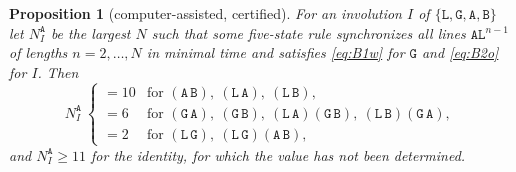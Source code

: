 \documentclass[11pt]{article}
\newtheorem{proposition}[lemma]{Proposition}
\theoremstyle{remark}
\newcommand{\Lq}{\mathtt{L}}\newcommand{\Gq}{\mathtt{G}}\newcommand{\Aq}{\mathtt{A}}\newcommand{\Bq}{\mathtt{B}}\newcommand{\Fq}{\mathtt{F}}
\begin{document}
\begin{proposition}[computer-assisted, certified]\label{prop:otherstate}
For an involution $I$ of $\{\Lq,\Gq,\Aq,\Bq\}$ let $N^{\Aq}_I$ be the largest $N$ such that some five-state
rule synchronizes all lines $\Aq\Lq^{n-1}$ of lengths $n=2,\dots,N$ in minimal time and satisfies
\eqref{eq:B1w} for $\Gq$ and \eqref{eq:B2o} for $I$. Then
\[
N^{\Aq}_I\ \begin{cases}
=10&\text{for }(\Aq\,\Bq),\ (\Lq\,\Aq),\ (\Lq\,\Bq),\\
=6&\text{for }(\Gq\,\Aq),\ (\Gq\,\Bq),\ (\Lq\,\Aq)(\Gq\,\Bq),\ (\Lq\,\Bq)(\Gq\,\Aq),\\
=2&\text{for }(\Lq\,\Gq),\ (\Lq\,\Gq)(\Aq\,\Bq),
\end{cases}
\]
and $N^{\Aq}_I\ge11$ for the identity, for which the value has not been determined.
\end{proposition}
\end{document}

